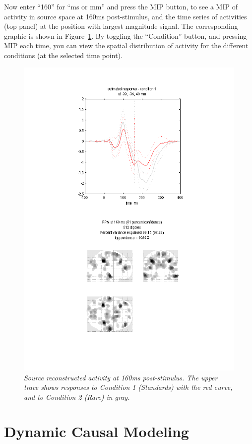 Now enter ``160'' for ``ms or mm'' and press the MIP button, to see a MIP of activity in source space at 160ms post-stimulus, and the time series of activities (top panel) at the position with largest magnitude signal. The corresponding graphic is shown in Figure~\ref{invert}. By toggling the ``Condition'' button, and pressing MIP each time, you can view the spatial distribution of activity for the different conditions (at the selected time point).
\begin{figure}
\begin{center}
\includegraphics[width=120mm]{mmn/invert}
\caption{\em Source reconstructed activity at 160ms post-stimulus.
The upper trace shows responses to Condition 1 (Standards) with the red curve, and to Condition 2 (Rare) in gray.
\label{invert}}
\end{center}
\end{figure}

\section{Dynamic Causal Modeling}

